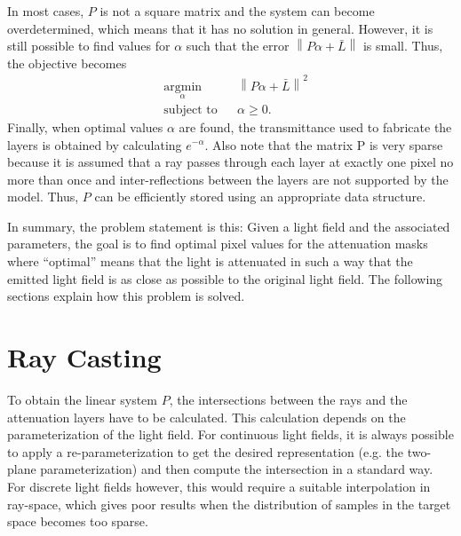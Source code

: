In most cases, $P$ is not a square matrix and the system can become overdetermined, which means that it has no solution in general.
However, it is still possible to find values for $\alpha$ such that the error $\left\lVert P \alpha + \bar{L} \right\rVert$ is small. 
Thus, the objective becomes
\begin{equation} \label{eq:minimize_norm}
	\begin{aligned}
		& \underset{\alpha}{\text{argmin}} 	& & \left\lVert P \alpha + \bar{L} \right\rVert ^2 \\
		& \text{subject to} 				& & \alpha \geq 0.
	\end{aligned}
\end{equation}
Finally, when optimal values $\alpha$ are found, the transmittance used to fabricate the layers is obtained by calculating $e^{-\alpha}$.
Also note that the matrix P is very sparse because it is assumed that a ray passes through each layer at exactly one pixel no more than once and inter-reflections between the layers are not supported by the model.
Thus, $P$ can be efficiently stored using an appropriate data structure.

In summary, the problem statement is this:
Given a light field and the associated parameters, the goal is to find optimal pixel values for the attenuation masks where ``optimal'' means that the light is attenuated in such a way that the emitted light field is as close as possible to the original light field.
The following sections explain how this problem is solved.

\section{Ray Casting}
\label{sec:ray_casting}

To obtain the linear system $P$, the intersections between the rays and the attenuation layers have to be calculated.
This calculation depends on the parameterization of the light field.
For continuous light fields, it is always possible to apply a re-parameterization to get the desired representation (e.g. the two-plane parameterization) and then compute the intersection in a standard way.
For discrete light fields however, this would require a suitable interpolation in ray-space, which gives poor results when the distribution of samples in the target space becomes too sparse.

